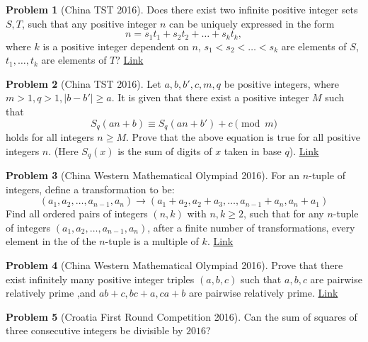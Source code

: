 \documentclass[]{article}
\theoremstyle{definition}
\newtheorem{problem}{Problem}
\begin{document}
\begin{problem}[China TST 2016]
	Does there exist two infinite positive integer sets $S,T$, such that any positive integer $n$ can be uniquely expressed in the form
	$$n=s_1t_1+s_2t_2+\dots+s_kt_k,$$where $k$ is a positive integer dependent on $n$, $s_1<s_2<\dots<s_k$ are elements of $S$, $t_1,\dots, t_k$ are elements of $T$? \hfill \href{http://artofproblemsolving.com/community/c6h1215112p6043327}{Link}
\end{problem}



\begin{problem}[China TST 2016]
	Let $a,b,b',c,m,q$ be positive integers, where $m>1,q>1,|b-b'|\ge a$. It is given that there exist a positive integer $M$ such that
	$$S_q(an+b)\equiv S_q(an+b')+c\pmod{m}$$
	holds for all integers $n\ge M$. Prove that the above equation is true for all positive integers $n$. (Here $S_q(x)$ is the sum of digits of $x$ taken in base $q$). \hfill \href{http://artofproblemsolving.com/community/c6h1217570p6069193}{Link}
\end{problem}



\begin{problem}[China Western Mathematical Olympiad 2016]
	For an $n$-tuple of integers, define a transformation to be:
	$$(a_1,a_2,\dots,a_{n-1},a_n)\rightarrow (a_1+a_2, a_2+a_3, \dots, a_{n-1}+a_n, a_n+a_1)$$
	Find all ordered pairs of integers $(n,k)$ with $n,k\geq 2$, such that for any $n$-tuple of integers $(a_1,a_2,\dots,a_{n-1},a_n)$, after a finite number of transformations, every element in the of the $n$-tuple is a multiple of $k$. \hfill \href{http://artofproblemsolving.com/community/c6h1292364p6843838}{Link}
\end{problem}



\begin{problem}[China Western Mathematical Olympiad 2016]
	Prove that there exist infinitely many positive integer triples $(a,b,c)$ such that $a ,b,c$ are pairwise relatively prime ,and $ab+c ,bc+a ,ca+b$ are pairwise relatively prime. \hfill \href{http://artofproblemsolving.com/community/c6h1290756p6827171}{Link}
\end{problem}




\begin{problem}[Croatia First Round Competition 2016]
	Can the sum of squares of three consecutive integers be divisible by $2016$?
\end{problem}
\end{document}
